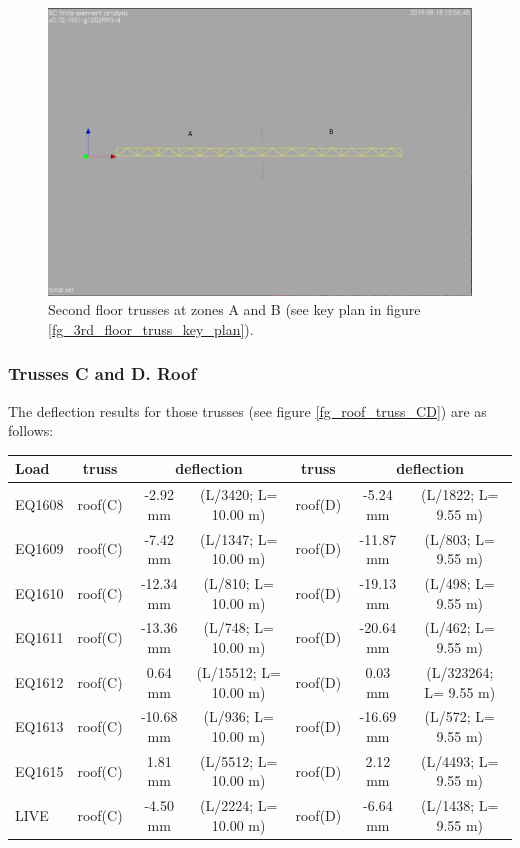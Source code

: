 \begin{figure}
  \begin{center}
  \includegraphics[width=120mm]{figures/2nd_floor_truss_AB}
  \end{center}
  \caption{Second floor trusses at zones A and B (see key plan in figure \ref{fg_3rd_floor_truss_key_plan}).}\label{fg_2nd_floor_truss_AB}
\end{figure}

\subsubsection{Trusses C and D. Roof}
The deflection results for those trusses (see figure \ref{fg_roof_truss_CD}) are as follows:

\begin{center}
  \begin{scriptsize}
  \begin{tabular}{|l|c|c|c|c|c|c|}
    \hline
    \textbf{Load} & \textbf{truss} & \multicolumn{2}{c|}{\textbf{deflection}} & \textbf{truss} & \multicolumn{2}{c|}{\textbf{deflection}} \\
    \hline
EQ1608 & roof(C) & -2.92 mm & (L/3420; L= 10.00 m) & roof(D) & -5.24 mm & (L/1822; L= 9.55 m) \\
EQ1609 & roof(C) & -7.42 mm & (L/1347; L= 10.00 m) & roof(D) & -11.87 mm & (L/803; L= 9.55 m) \\
EQ1610 & roof(C) & -12.34 mm & (L/810; L= 10.00 m) & roof(D) & -19.13 mm & (L/498; L= 9.55 m) \\
EQ1611 & roof(C) & -13.36 mm & (L/748; L= 10.00 m) & roof(D) & -20.64 mm & (L/462; L= 9.55 m) \\
EQ1612 & roof(C) & 0.64 mm & (L/15512; L= 10.00 m) & roof(D) & 0.03 mm & (L/323264; L= 9.55 m) \\
EQ1613 & roof(C) & -10.68 mm & (L/936; L= 10.00 m) & roof(D) & -16.69 mm & (L/572; L= 9.55 m) \\
EQ1615 & roof(C) & 1.81 mm & (L/5512; L= 10.00 m) & roof(D) & 2.12 mm & (L/4493; L= 9.55 m) \\
LIVE & roof(C) & -4.50 mm & (L/2224; L= 10.00 m) & roof(D) & -6.64 mm & (L/1438; L= 9.55 m) \\
\hline
  \end{tabular}
  \end{scriptsize}
\end{center}


